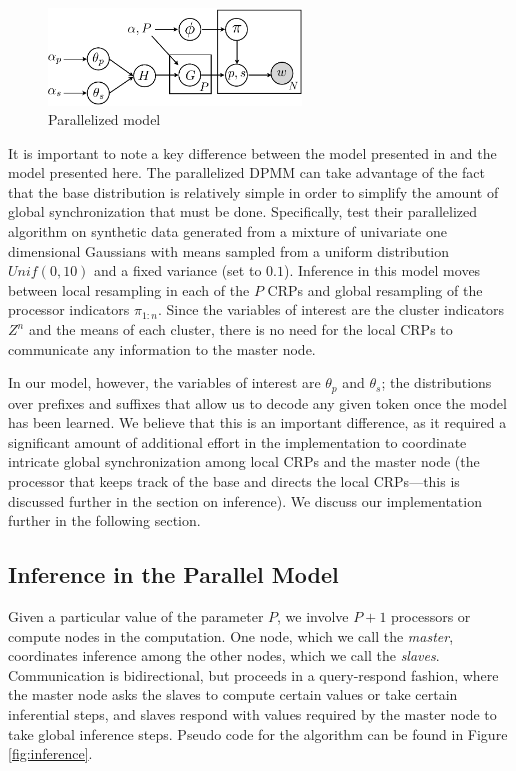 \begin{figure}[h]
  \centering
  \includegraphics[width=0.6\textwidth]{fig/v3}
  \caption{Parallelized model}
  \label{fig:v3}
\end{figure}

It is important to note a key difference between the model presented
in \cite{williamson2013} and the model presented here. The
parallelized DPMM can take advantage of the fact that the base
distribution is relatively simple in order to simplify the amount of
global synchronization that must be done. Specifically,
\cite{williamson2013} test their parallelized algorithm on synthetic
data generated from a mixture of univariate one dimensional Gaussians
with means sampled from a uniform distribution $Unif(0, 10)$ and a
fixed variance (set to $0.1$). Inference in this model moves between
local resampling in each of the $P$ CRPs and global resampling of the
processor indicators $\pi_{1:n}$. Since the variables of interest are
the cluster indicators $Z^n$ and the means of each cluster, there is
no need for the local CRPs to communicate any information to the
master node.

In our model, however, the variables of interest are $\theta_p$ and
$\theta_s$; the distributions over prefixes and suffixes that allow us
to decode any given token once the model has been learned. We believe
that this is an important difference, as it required a significant
amount of additional effort in the implementation to coordinate
intricate global synchronization among local CRPs and the master node
(the processor that keeps track of the base and directs the local
CRPs---this is discussed further in the section on inference). We
discuss our implementation further in the following section.

\subsection{Inference in the Parallel Model}

Given a particular value of the parameter $P$, we involve $P + 1$
processors or compute nodes in the computation. One node, which we
call the \textit{master}, coordinates inference among the other nodes,
which we call the \textit{slaves}. Communication is bidirectional, but
proceeds in a query-respond fashion, where the master node asks the
slaves to compute certain values or take certain inferential steps,
and slaves respond with values required by the master node to take
global inference steps. Pseudo code for the algorithm can be found in
Figure \ref{fig:inference}.


